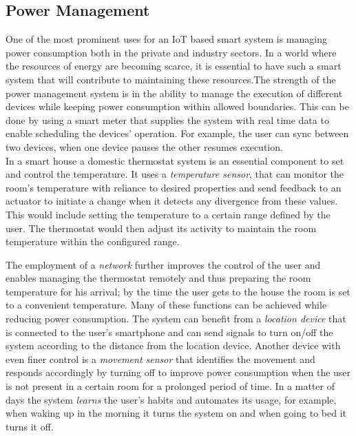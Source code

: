\documentclass{llncs}
\begin{document}
\subsection{Power Management}
One of the most prominent uses for an IoT based smart system is managing power consumption both in the private and industry sectors. In a world where the resources of energy are becoming scarce, it is essential to have such a smart system that will contribute to maintaining these resources.The strength of the power management system is in the ability to manage the execution of different devices while keeping power consumption within allowed boundaries. This can be done by using a smart meter\cite{Venables2007} that supplies the system with real time data to enable scheduling the devices' operation. For example, the user can sync between two devices, when one device pauses the other resumes execution. \\
In a smart house a domestic thermostat system is an essential component to set and control the temperature. It uses a \textit{temperature sensor}, that can monitor the room's temperature with reliance to desired properties and send feedback to an actuator to initiate a change when it detects any divergence from these values. This would include setting the temperature to a certain range defined by the user. The thermostat would then adjust its activity to maintain the room temperature within the configured range.

The employment of a \textit{network} further improves the control of the user and enables managing the thermostat remotely and thus preparing the room temperature for his arrival; by the time the user gets to the house the room is set to a convenient temperature. Many of these functions can be achieved while reducing power consumption. The system can benefit from a \textit{location device} that is connected to the user's smartphone and can send signals to turn on/off the system according to the distance from the location device. Another device with even finer control is a \textit{movement sensor} that identifies the movement and responds accordingly by turning off to improve power consumption when the user is not present in a certain room for a prolonged period of time. In a matter of days the system \textit{learns} the user's habits and automates its usage, for example, when waking up in the morning it turns the system on and when going to bed it turns it off. \\
\end{document}
